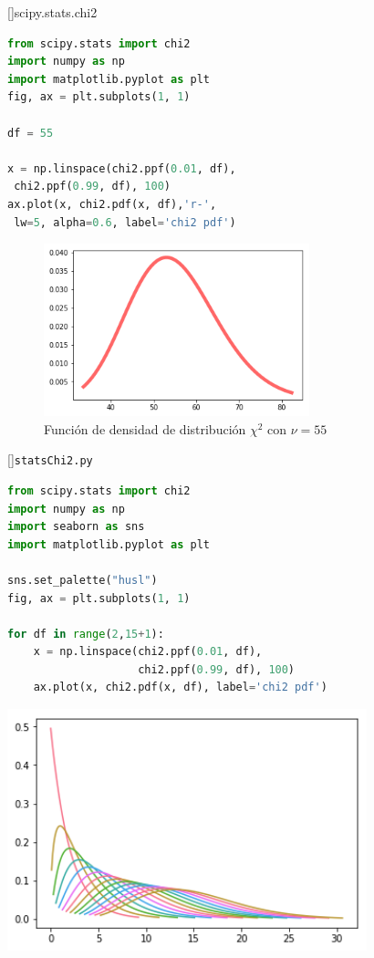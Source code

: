 []{scipy.stats.chi2}
\begin{lstlisting}[language=Python]
from scipy.stats import chi2
import numpy as np
import matplotlib.pyplot as plt
fig, ax = plt.subplots(1, 1)

df = 55

x = np.linspace(chi2.ppf(0.01, df),
 chi2.ppf(0.99, df), 100)
ax.plot(x, chi2.pdf(x, df),'r-',
 lw=5, alpha=0.6, label='chi2 pdf')
\end{lstlisting}



\begin{figure}
 \centering
 \includegraphics[height=5cm,keepaspectratio=true]{./images/statsChi2.png}
 \caption{Función de densidad de distribución $\chi^2$ con $\nu=55$}
 \label{fig:Chi2}
\end{figure}


[]{\texttt{statsChi2.py}}
\begin{lstlisting}[language=Python]
from scipy.stats import chi2
import numpy as np
import seaborn as sns
import matplotlib.pyplot as plt

sns.set_palette("husl")
fig, ax = plt.subplots(1, 1)

for df in range(2,15+1):
    x = np.linspace(chi2.ppf(0.01, df),
                    chi2.ppf(0.99, df), 100)
    ax.plot(x, chi2.pdf(x, df), label='chi2 pdf')
\end{lstlisting}



\begin{center}
 \includegraphics[height=7cm,keepaspectratio=true]{./images/statsChi2Several.png}
\end{center}


